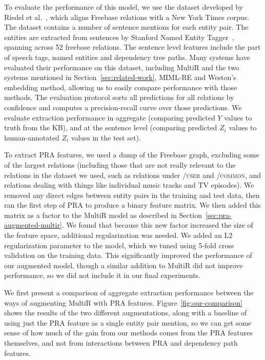 \documentclass[11pt,a4paper]{article}
\newcommand{\secref}[1]{Section~\ref{sec:#1}}
\newcommand{\figref}[1]{Figure~\ref{fig:#1}}
\newcommand{\relation}[1]{\textsc{#1}}
\begin{document}
To evaluate the performance of this model, we use the dataset developed by
Riedel et al.~, which aligns
Freebase relations with a New York Times corpus.  The dataset contains a number
of sentence mentions for each entity pair. The entities are extracted from
sentences by Stanford Named Entity Tagger~\cite{finkel-2005-non-local-ie},
spanning across 52 freebase relations.  The sentence level features include the
part of speech tags, named entities and dependency tree paths.  Many systems
have evaluated their performance on this dataset, including MultiR and the two
systems mentioned in \secref{related-work}, MIML-RE and Weston's embedding
method, allowing us to easily compare performance with those methods.  The
evaluation protocol sorts all predictions for all relations by confidence and
computes a precision-recall curve over those predictions.  We evaluate
extraction performance in aggregate (comparing predicted $Y$ values to truth
from the KB), and at the sentence level (comparing predicted $Z_i$ values to
human-annotated $Z_i$ values in the test set).

To extract PRA features, we used a dump of the Freebase graph, excluding some
of the largest relations (including those that are not really relevant to the
relations in the dataset we used, such as relations under \relation{/user} and
\relation{/common}, and relations dealing with things like individual music
tracks and TV episodes).  We removed any direct edges between entity pairs in
the training and test data, then ran the first step of PRA to produce a binary
feature matrix.  We then added this matrix as a factor to the MultiR model as
described in \secref{pra-augmented-multir}.  We found that because this new
factor increased the size of the feature space, additional regularization was
needed.  We added an L2 regularization parameter to the model, which we tuned
using 5-fold cross validation on the training data.  This significantly
improved the performance of our augmented model, though a similar addition to
MultiR did not improve performance, so we did not include it in our final
experiments.

We first present a comparison of aggregate extraction performance between the
ways of augmenting MultiR with PRA features.  \figref{our-comparison} shows the
results of the two different augmentations, along with a baseline of using just
the PRA feature as a single entity pair mention, so we can get some sense of
how much of the gain from our methods comes from the PRA features themselves,
and not from interactions between PRA and dependency path features.
\end{document}
